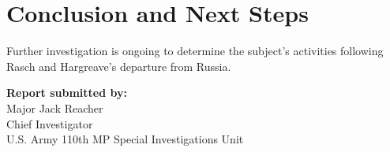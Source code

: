\documentclass{article}
\begin{document}
	\section*{Conclusion and Next Steps}
	
	Further investigation is ongoing to determine the subject’s activities following Rasch and Hargreave’s departure from Russia.
	
	\vspace{1cm}
	\noindent
	\textbf{Report submitted by:} \\
	Major Jack Reacher \\
	Chief Investigator \\
	U.S. Army 110th MP Special Investigations Unit
	
\end{document}
